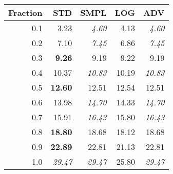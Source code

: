\documentclass{standalone}
\begin{document}
\begin{tabular}{r|rrrr}
      \toprule
      Fraction & STD & SMPL & LOG & ADV\\
      \midrule
      0.1 & 3.23 & \emph{4.60} & 4.13 & \emph{4.60}\\
  0.2 & 7.10 & \emph{7.45} & 6.86 & \emph{7.45}\\
  0.3 & \textbf{9.26} & 9.19 & 9.22 & 9.19\\
  0.4 & 10.37 & \emph{10.83} & 10.19 & \emph{10.83}\\
  0.5 & \textbf{12.60} & 12.51 & 12.54 & 12.51\\
  0.6 & 13.98 & \emph{14.70} & 14.33 & \emph{14.70}\\
  0.7 & 15.91 & \emph{16.43} & 15.80 & \emph{16.43}\\
  0.8 & \textbf{18.80} & 18.68 & 18.12 & 18.68\\
  0.9 & \textbf{22.89} & 22.81 & 21.13 & 22.81\\
  1.0 & \emph{29.47} & \emph{29.47} & 25.80 & \emph{29.47}\\
  \bottomrule
\end{tabular}
\end{document}
